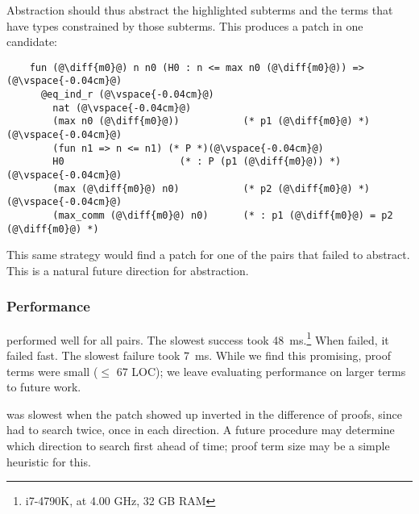 Abstraction should thus abstract the highlighted subterms and the
terms that have types constrained by those subterms.
This produces a patch in one candidate:

\begin{lstlisting}
    fun (@\diff{m0}@) n n0 (H0 : n <= max n0 (@\diff{m0}@)) =>(@\vspace{-0.04cm}@)
      @eq_ind_r (@\vspace{-0.04cm}@)
        nat (@\vspace{-0.04cm}@)
        (max n0 (@\diff{m0}@))           (* p1 (@\diff{m0}@) *)(@\vspace{-0.04cm}@)
        (fun n1 => n <= n1) (* P *)(@\vspace{-0.04cm}@)
        H0                    (* : P (p1 (@\diff{m0}@)) *)(@\vspace{-0.04cm}@)
        (max (@\diff{m0}@) n0)           (* p2 (@\diff{m0}@) *)(@\vspace{-0.04cm}@)
        (max_comm (@\diff{m0}@) n0)      (* : p1 (@\diff{m0}@) = p2 (@\diff{m0}@) *)
\end{lstlisting}

This same strategy would find a patch for one of the pairs that \sysname failed to 
abstract. %
This is a natural future direction for abstraction.

\subsubsection{Performance}
\label{sec:perf}

\sysname performed well for all pairs. The slowest success took \SI{48}{\ms}.\footnote{i7-4790K, at 4.00 GHz, 32 GB RAM}
When \sysname failed, it failed fast. The slowest failure took \SI{7}{\ms}.
While we find this promising, proof terms were small ($\le$ 67 LOC);
we leave evaluating performance on larger terms
to future work.



\sysname was slowest %
when the patch showed up inverted in the difference of proofs,
since \sysname had to search twice, once in each direction.
A future procedure may %
determine which direction to search first ahead of time; proof term size may be a simple heuristic for this.

